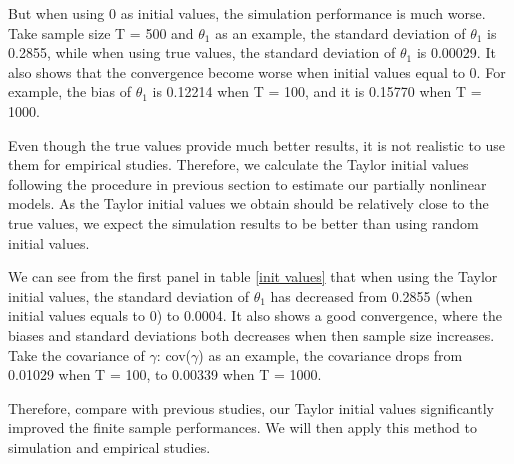 \documentclass[a4paper,12pt,times,numbered,print,index]{report}
\numberwithin{equation}{section}
\begin{document}
But when using 0 as initial values, the simulation performance is much worse. Take sample size T = 500 and $\theta_1$ as an example, the standard deviation of $\theta_1$ is 0.2855, while when using true values, the standard deviation of $\theta_1$ is 0.00029. It also shows that the convergence become worse when initial values equal to 0. For example, the bias of $\theta_1$ is 0.12214 when T = 100, and it is 0.15770 when T = 1000.

Even though the true values provide much better results, it is not realistic to use them for empirical studies. Therefore, we calculate the Taylor initial values following the procedure in previous section to estimate our partially nonlinear models. As the Taylor initial values we obtain should be relatively close to the true values, we expect the simulation results to be better than using random initial values. 

We can see from the first panel in table \ref{init values} that when using the Taylor initial values, the standard deviation of $\theta_1$ has decreased from 0.2855 (when initial values equals to 0) to 0.0004. It also shows a good convergence, where the biases and standard deviations both decreases when then sample size increases. Take the covariance of $\gamma$: cov($\gamma$) as an example, the covariance drops from 0.01029 when T = 100, to 0.00339 when T = 1000. 

Therefore, compare with previous studies, our Taylor initial values significantly improved the finite sample performances. We will then apply this method to simulation and empirical studies. 
\end{document}
